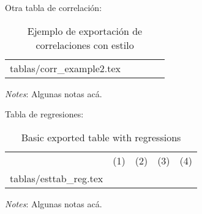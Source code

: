 \documentclass{article}
\makeatletter
\newcommand\primitiveinput[1]
{\@@input #1 }
\makeatother
\begin{document}
Otra tabla de correlación:

\begin{table}[H]
	\centering
	\label{tab:Table}
	\begin{adjustbox}{max width=\linewidth}
		\begin{threeparttable}
			\caption{Ejemplo de exportación de correlaciones con estilo}
			\begin{tabular}{@{}l*{4}{c}@{}}
        \toprule
        \toprule 
				\primitiveinput{tablas/corr_example2.tex}
				\bottomrule
			\end{tabular}
			\begin{tablenotes}
				\setlength{}
				\footnotesize
				\item \textit{Notes}: Algunas notas acá.
			\end{tablenotes}
		\end{threeparttable}
	\end{adjustbox}
\end{table}


Tabla de regresiones:

\begin{table}[H]
	\centering
	\label{tab:Table2}
	\begin{adjustbox}{max width=\linewidth}
		\begin{threeparttable}
			\caption{Basic exported table with regressions}
			\begin{tabular}{@{}l*{4}{c}@{}}
        \toprule
        \toprule 
				& (1) & (2) & (3) & (4) \\
				\primitiveinput{tablas/esttab_reg.tex}
				\bottomrule
			\end{tabular}
			\begin{tablenotes}
				\setlength\labelsep{0pt}
				\footnotesize
				\item \textit{Notes}: Algunas notas acá.
			\end{tablenotes}
		\end{threeparttable}
	\end{adjustbox}
\end{table}

\end{document}
